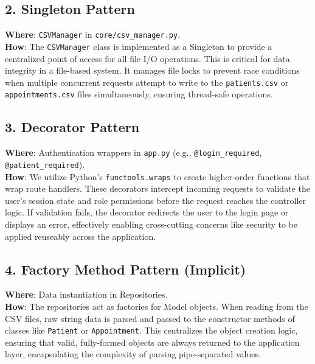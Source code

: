 \documentclass[12pt,a4paper]{article}
\begin{document}
\subsection{2. Singleton Pattern}
\textbf{Where}: \texttt{CSVManager} in \texttt{core/csv\_manager.py}. \\
\textbf{How}: The \texttt{CSVManager} class is implemented as a Singleton to provide a centralized point of access for all file I/O operations. This is critical for data integrity in a file-based system. It manages file locks to prevent race conditions when multiple concurrent requests attempt to write to the \texttt{patients.csv} or \texttt{appointments.csv} files simultaneously, ensuring thread-safe operations.

\subsection{3. Decorator Pattern}
\textbf{Where}: Authentication wrappers in \texttt{app.py} (e.g., \texttt{@login\_required}, \texttt{@patient\_required}). \\
\textbf{How}: We utilize Python's \texttt{functools.wraps} to create higher-order functions that wrap route handlers. These decorators intercept incoming requests to validate the user's session state and role permissions before the request reaches the controller logic. If validation fails, the decorator redirects the user to the login page or displays an error, effectively enabling cross-cutting concerns like security to be applied reuseably across the application.

\subsection{4. Factory Method Pattern (Implicit)}
\textbf{Where}: Data instantiation in Repositories. \\
\textbf{How}: The repositories act as factories for Model objects. When reading from the CSV files, raw string data is parsed and passed to the constructor methods of classes like \texttt{Patient} or \texttt{Appointment}. This centralizes the object creation logic, ensuring that valid, fully-formed objects are always returned to the application layer, encapsulating the complexity of parsing pipe-separated values.

\end{document}
